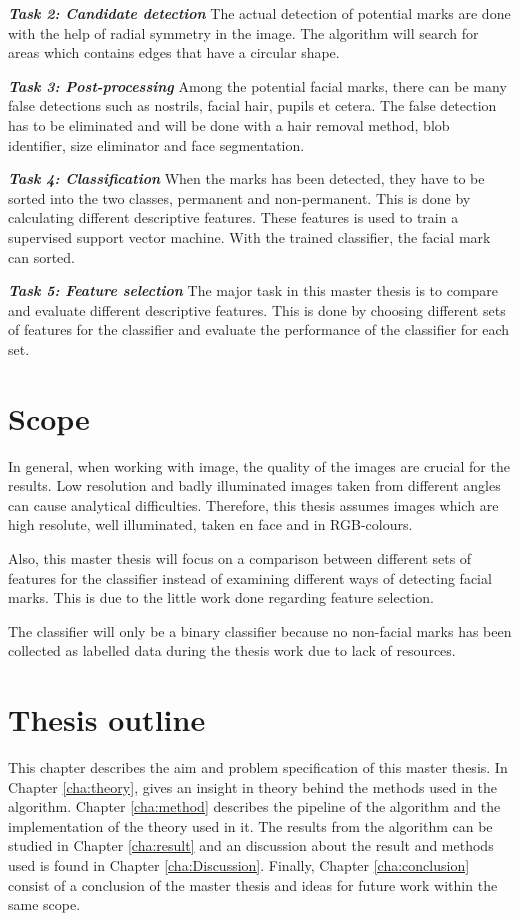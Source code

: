 \textbf{\textit{Task 2: Candidate detection}}
The actual detection of potential marks are done with the help of radial symmetry in the image. The algorithm will search for areas which contains edges that have a circular shape.   

\textbf{\textit{Task 3: Post-processing}}
Among the potential facial marks, there can be many false detections such as nostrils, facial hair, pupils et cetera. The false detection has to be eliminated and will be done with a hair removal method, blob identifier, size eliminator and face segmentation.

\textbf{\textit{Task 4: Classification}}
When the marks has been detected, they have to be sorted into the two classes, permanent and non-permanent. This is done by calculating different descriptive features. These features is used to train a supervised support vector machine. With the trained classifier, the facial mark can sorted. 

\textbf{\textit{Task 5: Feature selection}}
The major task in this master thesis is to compare and evaluate different descriptive features. This is done by choosing different sets of features for the classifier and evaluate the performance of the classifier for each set. 

\section{Scope}

In general, when working with image, the quality of the images are crucial for the results. Low resolution and badly illuminated images taken from different angles can cause analytical difficulties. Therefore, this thesis assumes images which are high resolute, well illuminated, taken en face and in RGB-colours. 

Also, this master thesis will focus on a comparison between different sets of features for the classifier instead of examining different ways of detecting facial marks. This is due to the little work done regarding feature selection. 

The classifier will only be a binary classifier because no non-facial marks has been collected as labelled data during the thesis work due to lack of resources.   

\section{Thesis outline}

This chapter describes the aim and problem specification of this master thesis. In Chapter \ref{cha:theory}, gives an insight in theory behind the methods used in the algorithm. Chapter \ref{cha:method} describes the pipeline of the algorithm and the implementation of the theory used in it. The results from the algorithm can be studied in Chapter \ref{cha:result} and an discussion about the result and methods used is found in Chapter \ref{cha:Discussion}. Finally, Chapter \ref{cha:conclusion} consist of a conclusion of the master thesis and ideas for future work within the same scope. 